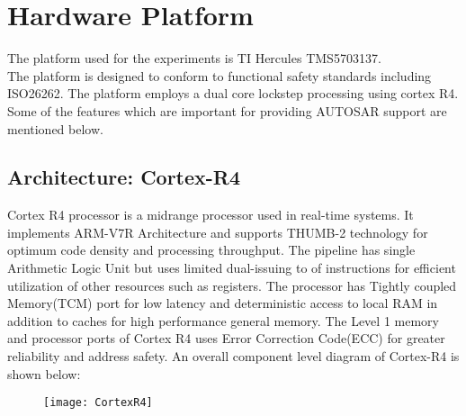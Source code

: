 \section{Hardware Platform}
The platform used for the experiments is TI Hercules TMS5703137.\\
The platform is designed to conform to functional safety standards including ISO26262.
The platform employs a dual core lockstep processing using cortex R4. 
Some of the features which are important for providing AUTOSAR support are mentioned below.

\subsection{Architecture: Cortex-R4}
Cortex R4 processor is a midrange processor used in real-time systems.
It implements ARM-V7R Architecture and supports THUMB-2 technology for optimum code density and processing throughput.
The pipeline has single Arithmetic Logic Unit but uses limited dual-issuing to of instructions for efficient utilization of other resources such as registers.
The processor has Tightly coupled Memory(TCM) port for low latency and deterministic access to local RAM in addition to caches for high performance general memory.
The Level 1 memory and processor ports of Cortex R4 uses Error Correction Code(ECC) for greater reliability and address safety.
An overall component level diagram of Cortex-R4 is shown below:
\begin{figure}[h]
	\texttt{[image: CortexR4]}
\end{figure}

